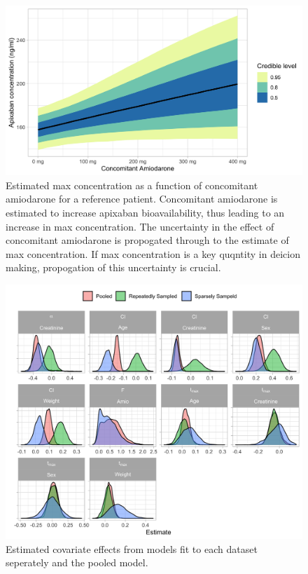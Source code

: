 \begin{figure}
	
	{\centering \includegraphics[width=\linewidth]{figures/max-concentration-1} 
		
	}
	
	\caption{Estimated max concentration as a function of concomitant amiodarone for a reference patient.  Concomitant amiodarone is estimated to increase apixaban bioavailability, thus leading to an increase in max concentration. The uncertainty in the effect of concomitant amiodarone is propogated through to the estimate of max concentration.  If max concentration is a key quqntity in deicion making, propogation of this uncertainty is crucial.}\label{fig:max-concentration}
\end{figure}

\begin{figure}
	
	{\centering \includegraphics[width=\linewidth]{figures/effect-estimates-1} 
		
	}
	
	\caption{Estimated covariate effects from models fit to each dataset seperately and the pooled model.}\label{fig:effect-estimates}
\end{figure}
